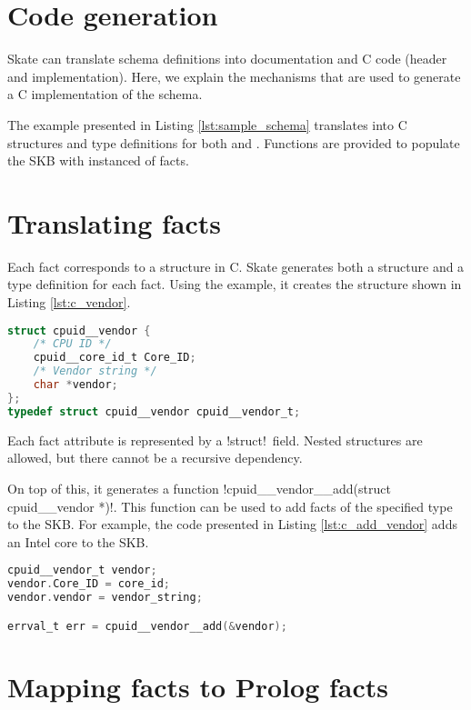 \documentclass[a4paper,11pt,twoside]{report}
\begin{document}
{{

\section{Code generation}

Skate can translate schema definitions into documentation and C code (header
and implementation). Here, we explain the mechanisms that are used to generate a
C implementation of the schema.

The example presented in Listing \ref{lst:sample_schema} translates into C
structures and type definitions for both  and
. Functions are provided to populate the SKB with instanced of
facts.

\section{Translating facts}

Each fact corresponds to a structure in C. Skate generates both a structure
and a type definition for each fact. Using the example, it creates the
structure shown in Listing \ref{lst:c_vendor}.

\begin{lstlisting}[caption={C header for fact
\varname{vendor}},label={lst:c_vendor},language=C]
struct cpuid__vendor {
    /* CPU ID */
    cpuid__core_id_t Core_ID;
    /* Vendor string */
    char *vendor;
};
typedef struct cpuid__vendor cpuid__vendor_t;
\end{lstlisting}

Each fact attribute is represented by a \ccode!struct!~field. Nested structures are
allowed, but there cannot be a recursive dependency.

On top of this, it generates a function
\ccode!cpuid__vendor__add(struct cpuid__vendor *)!.
This function can be used to add facts of the specified type to the SKB. For
example, the code presented in Listing \ref{lst:c_add_vendor} adds an Intel core
to the SKB.

\begin{lstlisting}[caption={C example to add a vendor fact.},
label={lst:c_add_vendor}, language=C]
cpuid__vendor_t vendor;
vendor.Core_ID = core_id;
vendor.vendor = vendor_string;

errval_t err = cpuid__vendor__add(&vendor);
\end{lstlisting}

\section{Mapping facts to Prolog facts}

}}
\end{document}
